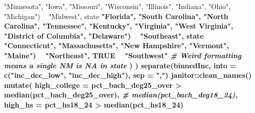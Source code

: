 \documentclass[
  11pt,
]{article}
\newenvironment{Shaded}{\begin{snugshade}}{\end{snugshade}}
\newcommand{\CommentTok}[1]{\textcolor[rgb]{0.56,0.35,0.01}{\textit{#1}}}
\newcommand{\DataTypeTok}[1]{\textcolor[rgb]{0.13,0.29,0.53}{#1}}
\newcommand{\DecValTok}[1]{\textcolor[rgb]{0.00,0.00,0.81}{#1}}
\newcommand{\KeywordTok}[1]{\textcolor[rgb]{0.13,0.29,0.53}{\textbf{#1}}}
\newcommand{\NormalTok}[1]{#1}
\newcommand{\OperatorTok}[1]{\textcolor[rgb]{0.81,0.36,0.00}{\textbf{#1}}}
\newcommand{\OtherTok}[1]{\textcolor[rgb]{0.56,0.35,0.01}{#1}}
\newcommand{\StringTok}[1]{\textcolor[rgb]{0.31,0.60,0.02}{#1}}
\begin{document}
\begin{Shaded}
\begin{Highlighting}[]
{{{{{{                   \StringTok{"Minnesota"}\NormalTok{, }\StringTok{"Iowa"}\NormalTok{, }\StringTok{"Missouri"}\NormalTok{, }\StringTok{"Wisconsin"}\NormalTok{, }\StringTok{"Illinois"}\NormalTok{, }
                   \StringTok{"Indiana"}\NormalTok{, }\StringTok{"Ohio"}\NormalTok{, }\StringTok{"Michigan"}\NormalTok{) }\OperatorTok{~}\StringTok{ "Midwest"}\NormalTok{,}
\NormalTok{      state }\OperatorTok{%
                   \StringTok{"Florida"}\NormalTok{, }\StringTok{"South Carolina"}\NormalTok{, }\StringTok{"North Carolina"}\NormalTok{, }\StringTok{"Tennessee"}\NormalTok{,}
                   \StringTok{"Kentucky"}\NormalTok{, }\StringTok{"Virginia"}\NormalTok{, }\StringTok{"West Virginia"}\NormalTok{, }\StringTok{"District of Columbia"}\NormalTok{,}
                   \StringTok{"Delaware"}\NormalTok{) }\OperatorTok{~}\StringTok{ "Southeast"}\NormalTok{,}
\NormalTok{      state }\OperatorTok{%
                   \StringTok{"Connecticut"}\NormalTok{, }\StringTok{"Massachusetts"}\NormalTok{, }\StringTok{"New Hampshire"}\NormalTok{, }\StringTok{"Vermont"}\NormalTok{, }\StringTok{"Maine"}\NormalTok{) }\OperatorTok{~}\StringTok{ "Northeast"}\NormalTok{,}
      \OtherTok{TRUE} \OperatorTok{~}\StringTok{ "Southwest"} \CommentTok{# Weird formatting means a single NM is NA in state}
\NormalTok{    )}
\NormalTok{  ) }\OperatorTok{%
\StringTok{  }\KeywordTok{separate}\NormalTok{(binnedInc, }\DataTypeTok{into =} \KeywordTok{c}\NormalTok{(}\StringTok{"inc_dec_low"}\NormalTok{, }\StringTok{"inc_dec_high"}\NormalTok{), }\DataTypeTok{sep =} \StringTok{","}\NormalTok{) }\OperatorTok{%
\StringTok{  }\NormalTok{janitor}\OperatorTok{::}\KeywordTok{clean_names}\NormalTok{() }\OperatorTok{%
\StringTok{  }\KeywordTok{mutate}\NormalTok{(}
    \DataTypeTok{high_college =}\NormalTok{ pct_bach_deg25_over }\OperatorTok{>}\StringTok{ }\KeywordTok{median}\NormalTok{(pct_bach_deg25_over), }\CommentTok{# median(pct_bach_deg18_24),}
    \DataTypeTok{high_hs =}\NormalTok{ pct_hs18_}\DecValTok{24} \OperatorTok{>}\StringTok{ }\KeywordTok{median}\NormalTok{(pct_hs18_}\DecValTok{24}\NormalTok{)}
}}}}}}}}}}}
\end{Highlighting}
\end{Shaded}
\end{document}
